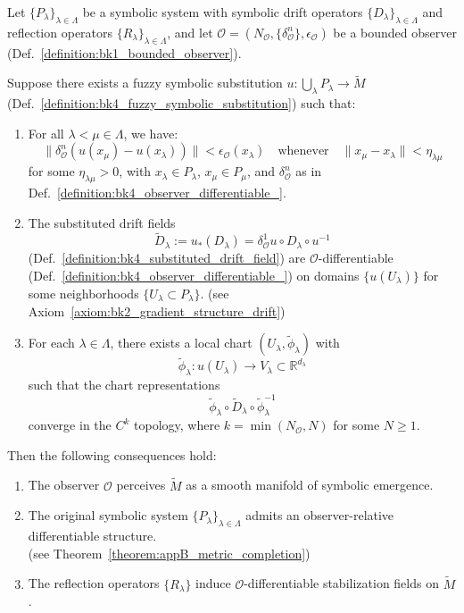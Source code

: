 \begin{theorem}
\label{theorem:bk4_fuzzy_symbolic_geometry_theorem}

Let $\{P_\lambda\}_{\lambda \in \Lambda}$ be a symbolic system with symbolic drift operators $\{D_\lambda\}_{\lambda \in \Lambda}$ and reflection operators $\{R_\lambda\}_{\lambda \in \Lambda}$, and let $\mathcal{O} = (N_\mathcal{O}, \{\delta^n_\mathcal{O}\}, \epsilon_\mathcal{O})$ be a bounded observer (Def.~\ref{definition:bk1_bounded_observer}).

Suppose there exists a fuzzy symbolic substitution $u : \bigcup_\lambda P_\lambda \to \tilde{M}$ (Def.~\ref{definition:bk4_fuzzy_symbolic_substitution}) such that:

\begin{enumerate}
    \item For all $\lambda < \mu \in \Lambda$, we have:
    \[
    \|\delta^n_\mathcal{O}(u(x_\mu) - u(x_\lambda))\| < \epsilon_\mathcal{O}(x_\lambda)
    \quad \text{whenever} \quad \|x_\mu - x_\lambda\| < \eta_{\lambda\mu}
    \]
    for some $\eta_{\lambda\mu} > 0$, with $x_\lambda \in P_\lambda$, $x_\mu \in P_\mu$, and $\delta^n_\mathcal{O}$ as in Def.~\ref{definition:bk4_observer_differentiable_}. 
    
    \item The substituted drift fields 
    \[
    \tilde{D}_\lambda := u_*(D_\lambda) = \delta^1_\mathcal{O}u \circ D_\lambda \circ u^{-1}
    \]
    (Def.~\ref{definition:bk4_substituted_drift_field}) 
    are $\mathcal{O}$-differentiable (Def.~\ref{definition:bk4_observer_differentiable_}) on domains $\{u(U_\lambda)\}$ for some neighborhoods $\{U_\lambda \subset P_\lambda\}$.
    (see Axiom~\ref{axiom:bk2_gradient_structure_drift})
    
    \item For each $\lambda \in \Lambda$, there exists a local chart $(U_\lambda, \tilde{\phi}_\lambda)$ with 
    \[
    \tilde{\phi}_\lambda: u(U_\lambda) \to V_\lambda \subset \mathbb{R}^{d_\lambda}
    \]
    such that the chart representations 
    \[
    \tilde{\phi}_\lambda \circ \tilde{D}_\lambda \circ \tilde{\phi}_\lambda^{-1}
    \]
    converge in the $C^k$ topology, where $k = \min(N_\mathcal{O}, N)$ for some $N \geq 1$.
\end{enumerate}

Then the following consequences hold:

\begin{enumerate}
    \item The observer $\mathcal{O}$ perceives $\tilde{M}$ as a smooth manifold of symbolic emergence.

    \item The original symbolic system $\{P_\lambda\}_{\lambda \in \Lambda}$ admits an observer-relative differentiable structure.
\\
    (see Theorem~\ref{theorem:appB_metric_completion})

    \item The reflection operators $\{R_\lambda\}$ induce $\mathcal{O}$-differentiable stabilization fields on $\tilde{M}$.
\end{enumerate}
\end{theorem}

